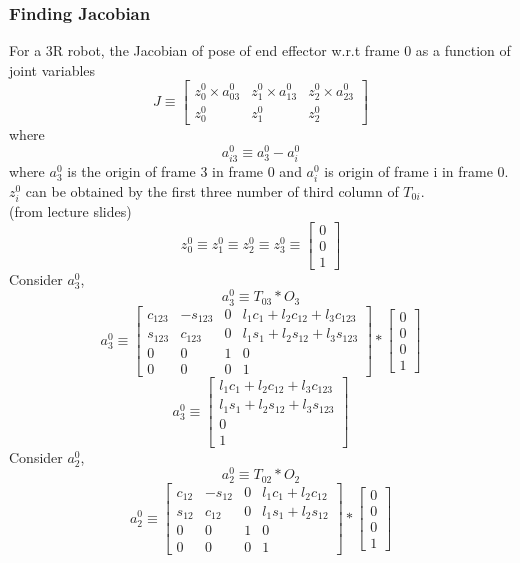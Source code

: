 \documentclass[12pt]{article}
\newcommand{\fromlectures}{{\\ \color{blue} \hspace*{\fill}(from lecture slides)} \\}
\begin{document}
\subsubsection*{Finding Jacobian}
For a 3R robot, the Jacobian of pose of end effector w.r.t frame 0 as a function of joint variables
\[
  J \equiv
  \begin{bmatrix} z_0^0 \times a_{03}^0 & z_1^0 \times a_{13}^0 & z_2^0 \times a_{23}^0 \\ z_0^0 & z_1^0 & z_2^0 \end{bmatrix}
\]
where
\[
  a_{i3}^{0} \equiv a_{3}^{0} - a_{i}^{0}
\]
where $a_3^0$ is the origin of frame 3 in frame 0 and $a_i^0$ is origin of frame i in frame 0.
$z_i^0$ can be obtained by the first three number of third column of $T_{0i}$.
\fromlectures
\[
  z_0^{0} \equiv z_1^{0} \equiv z_2^{0} \equiv z_3^{0} \equiv \begin{bmatrix} 0 \\ 0 \\ 1 \end{bmatrix}
\]
Consider $a_{3}^{0}$,
\[
  a_3^0 \equiv T_{03} * O_3
\]
\[
  a_3^0 \equiv
  \begin{bmatrix}
    c_{123} & -s_{123} & 0 & l_1c_1 + l_2c_{12} + l_3c_{123}\\
    s_{123} & c_{123}  & 0 & l_1s_1 + l_2s_{12} + l_3s_{123}\\
    0 & 0 & 1 & 0 \\
    0 & 0 & 0 & 1
  \end{bmatrix}
  *
  \begin{bmatrix} 0 \\ 0 \\ 0 \\ 1 \end{bmatrix}
\]
\[
  a_3^0 \equiv
  \begin{bmatrix}
    l_1c_1 + l_2c_{12} + l_3c_{123}\\
    l_1s_1 + l_2s_{12} + l_3s_{123}\\
    0 \\
    1
  \end{bmatrix}
\]
Consider $a_{2}^{0}$,
\[
  a_2^0 \equiv T_{02} * O_2
\]
\[
  a_2^0 \equiv
  \begin{bmatrix} c_{12} & -s_{12} & 0 & l_1c_1 + l_2c_{12} \\ s_{12} & c_{12} & 0 & l_1s_1 + l_2s_{12} \\ 0 & 0 & 1 & 0 \\ 0 & 0 & 0 & 1 \end{bmatrix}
  *
  \begin{bmatrix} 0 \\ 0 \\ 0 \\ 1 \end{bmatrix}
\]
\end{document}
